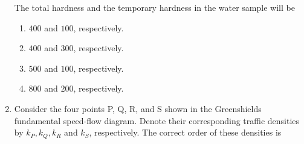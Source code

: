 \documentclass[journal]{IEEEtran}
\begin{document}
\begin{enumerate}
    The total hardness and the temporary hardness in the water sample  will be 
    \begin{enumerate}
        \item $400$ and $100$, respectively.
        \item $400$ and $300$, respectively.
        \item $500$ and $100$, respectively.
        \item $800$ and $200$, respectively. 
    \end{enumerate}
    \item Consider the four points P, Q, R, and S shown in the Greenshields fundamental
speed-flow diagram. Denote their corresponding traffic densities by $k_P,k_Q,k_R$ and $k_S$, respectively. The correct order of these densities is 


\end{enumerate}
\end{document}
